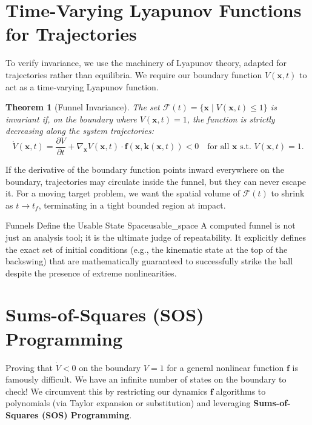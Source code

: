 \documentclass[12pt, openany]{book}
\theoremstyle{plain}
\newtheorem{theorem}{Theorem}[chapter]
\newcommand{\state}{\bm{x}}
\begin{document}
\section{Time-Varying Lyapunov Functions for Trajectories}

To verify invariance, we use the machinery of Lyapunov theory, adapted for trajectories rather than equilibria. We require our boundary function $V(\state, t)$ to act as a time-varying Lyapunov function.

\begin{theorem}[Funnel Invariance]\label{thm:funnel_invariance}
  The set $\mathcal{F}(t) = \{ \state \mid V(\state, t) \leq 1 \}$ is invariant if, on the boundary where $V(\state, t) = 1$, the function is strictly decreasing along the system trajectories:
  \begin{equation}
    \dot{V}(\state, t) = \frac{\partial V}{\partial t} + \nabla_{\state} V(\state, t) \cdot \bm{f}(\state, \bm{k}(\state, t)) < 0 \quad \text{for all } \state \text{ s.t. } V(\state, t) = 1.
  \end{equation}
\end{theorem}

If the derivative of the boundary function points inward everywhere on the boundary, trajectories may circulate inside the funnel, but they can never escape it. For a moving target problem, we want the spatial volume of $\mathcal{F}(t)$ to shrink as $t \to t_f$, terminating in a tight bounded region at impact.

\begin{keyidea}{Funnels Define the Usable State Space}{usable_space}
  A computed funnel is not just an analysis tool; it is the ultimate judge of repeatability. It explicitly defines the exact set of initial conditions (e.g., the kinematic state at the top of the backswing) that are mathematically guaranteed to successfully strike the ball despite the presence of extreme nonlinearities.
\end{keyidea}

\section{Sums-of-Squares (SOS) Programming}

Proving that $\dot{V} < 0$ on the boundary $V=1$ for a general nonlinear function $\bm{f}$ is famously difficult. We have an infinite number of states on the boundary to check! We circumvent this by restricting our dynamics $\bm{f}$ algorithms to polynomials (via Taylor expansion or substitution) and leveraging \textbf{Sums-of-Squares (SOS) Programming}.
\end{document}
